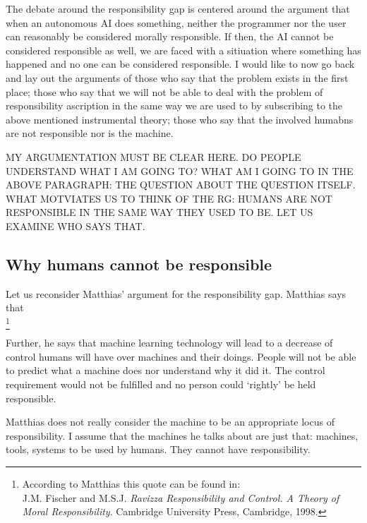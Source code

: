 \documentclass{article}
\begin{document}
The debate around the responsibility gap is centered around the argument that
when an autonomous AI does something, neither the programmer nor the user can
reasonably be considered morally responsible. If then, the AI cannot be
considered responsible as well, we are faced with a sitiuation where something
has happened and no one can be considered responsible. I would like to now go
back and lay out the arguments of those who say that the problem exists in the
first place; those who say that we will not be able to deal with the problem of
responsibility ascription in the same way we are used to by subscribing to the
above mentioned instrumental theory; those who say that the involved humabns are
not responsible nor is the machine. 

MY ARGUMENTATION MUST BE CLEAR HERE. DO PEOPLE UNDERSTAND WHAT I AM GOING TO?
WHAT AM I GOING TO IN THE ABOVE PARAGRAPH: THE QUESTION ABOUT THE QUESTION
ITSELF. WHAT MOTVIATES US TO THINK OF THE RG: HUMANS ARE NOT RESPONSIBLE IN THE
SAME WAY THEY USED TO BE. LET US EXAMINE WHO SAYS THAT.

\subsection{Why humans cannot be responsible}

Let us reconsider Matthias' argument for the responsibility gap. Matthias says
that\\

\footnote{According to Matthias this quote can be found in:\\
J.M. Fischer and M.S.J. \textit{Ravizza Responsibility and Control. A Theory of
Moral Responsibility}. Cambridge University Press, Cambridge, 1998.}

Further, he says that machine learning technology will lead to a decrease of
control humans will have over machines and their doings. People will not be able
to predict what a machine does nor understand why it did it. The control
requirement would not be fulfilled and no person could `rightly' be held
responsible.

Matthias does not really consider the machine to be an appropriate locus of
responsibility. I assume that the machines he talks about are just that:
machines, tools, systems to be used by humans. They cannot have
responsibility.\\
\end{document}
